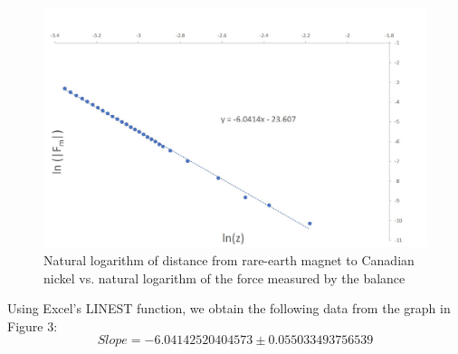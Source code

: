 \documentclass[letterpaper]{article}
\begin{document}
\begin{figure}[H]
 \centering
 \includegraphics[width=\textwidth]{nickel.jpg}
 \caption{Natural logarithm of distance from rare-earth magnet to Canadian nickel vs. natural logarithm of the force measured by the balance }
\end{figure}
\noindent Using Excel's LINEST function, we obtain the following data from the graph in Figure 3:
$$Slope =-6.04142520404573 \pm 0.055033493756539 $$
\end{document}
